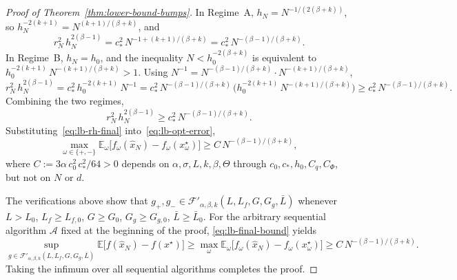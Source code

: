 \documentclass{article}
\renewcommand{\geq}{\geqslant}
\renewcommand{\hat}{\widehat}
\theoremstyle{definition}
\begin{document}
\begin{proof}[Proof of Theorem~\ref{thm:lower-bound-bumps}]
In Regime~A, $h_N=N^{-1/(2(\beta+k))}$, so 
$h_N^{-2(k+1)}=N^{(k+1)/(\beta+k)}$, and
\[
r_N^2\,h_N^{2(\beta-1)}
=c_*^2\,N^{-1+(k+1)/(\beta+k)}
=c_*^2\,N^{-(\beta-1)/(\beta+k)}.
\]
In Regime~B, $h_N=h_0$, and the inequality $N<h_0^{-2(\beta+k)}$ 
is equivalent to $h_0^{-2(k+1)}\,N^{-(k+1)/(\beta+k)}>1$. Using 
$N^{-1}=N^{-(\beta-1)/(\beta+k)}\cdot N^{-(k+1)/(\beta+k)}$,
\[
r_N^2\,h_N^{2(\beta-1)}
=c_*^2\,h_0^{-2(k+1)}\,N^{-1}
=c_*^2\,N^{-(\beta-1)/(\beta+k)}\,
\bigl(h_0^{-2(k+1)}\,N^{-(k+1)/(\beta+k)}\bigr)
\geq c_*^2\,N^{-(\beta-1)/(\beta+k)}.
\]
Combining the two regimes,
\begin{equation}
\label{eq:lb-rh-final}
r_N^2\,h_N^{2(\beta-1)}\geq c_*^2\,N^{-(\beta-1)/(\beta+k)}.
\end{equation}
Substituting~\eqref{eq:lb-rh-final} into~\eqref{eq:lb-opt-error},
\begin{equation}
\label{eq:lb-final-bound}
\max_{\omega\in\{+,-\}}\mathbb{E}_\omega
\bigl[f_\omega(\hat{x}_N)-f_\omega(x_\omega^\star)\bigr]
\geq C\,N^{-(\beta-1)/(\beta+k)},
\end{equation}
where $C:=3\alpha\,c_0^2\,c_*^2/64>0$ depends on 
$\alpha,\sigma,L,k,\beta,\Theta$ through 
$c_0,c_*,h_0,C_q,C_\Phi$, but not on $N$ or $d$.

The verifications above show that $g_+,g_-\in 
\mathcal{F}'_{\alpha,\beta,k}(L,L_f,G,G_g,\bar{L})$ whenever 
$L>L_0$, $L_f\geq L_{f,0}$, $G\geq G_0$, $G_g\geq G_{g,0}$, 
$\bar{L}\geq\bar{L}_0$. For the arbitrary sequential algorithm 
$\mathcal{A}$ fixed at the beginning of the proof, 
\eqref{eq:lb-final-bound} yields
\[
\sup_{g\in\mathcal{F}'_{\alpha,\beta,k}(L,L_f,G,G_g,\bar{L})}
\mathbb{E}\bigl[f(\hat{x}_N)-f(x^\star)\bigr]
\geq\max_{\omega}\mathbb{E}_\omega
\bigl[f_\omega(\hat{x}_N)-f_\omega(x_\omega^\star)\bigr]
\geq C\,N^{-(\beta-1)/(\beta+k)}.
\]
Taking the infimum over all sequential algorithms completes the 
proof.
\end{proof}
\end{document}
